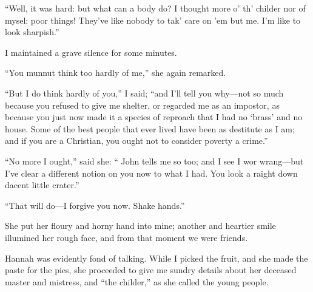 \enquote{Well, it was hard: but what can a body do? I thought more o'
	th' childer nor of mysel: poor things! They've like nobody to tak' care
	on 'em but me. I'm like to look sharpish.}

I maintained a grave silence for some minutes.

\enquote{You munnut think too hardly of me,} she again remarked.

\enquote{But I do think hardly of you,} I said; \enquote{and I'll tell
	you why---not so much because you refused to give me shelter, or
	regarded me as an impostor, as because you just now made it a species of
	reproach that I had no \enquote{brass} and no house. Some of the best
	people that ever lived have been as destitute as I am; and if you are a
	Christian, you ought not to consider poverty a crime.}

\enquote{No more I ought,} said she: \enquote{\Mr{} \St{} John tells me so
	too; and I see I wor wrang---but I've clear a different notion on you
	now to what I had. You look a raight down dacent little crater.}

\enquote{That will do---I forgive you now. Shake hands.}

She put her floury and horny hand into mine; another and heartier smile
illumined her rough face, and from that moment we were friends.

Hannah was evidently fond of talking. While I picked the fruit, and she
made the paste for the pies, she proceeded to give me sundry details
about her deceased master and mistress, and \enquote{the childer,} as
she called the young people.

